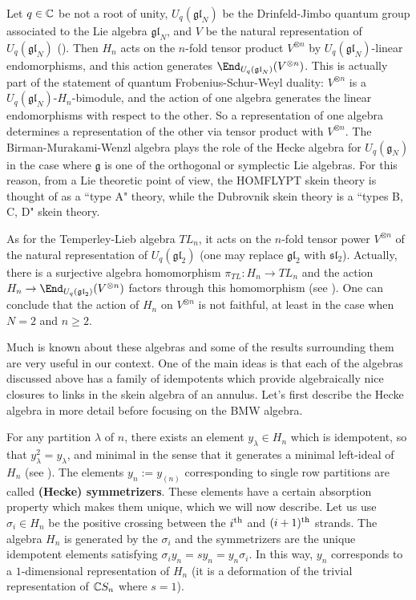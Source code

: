 Let $q \in \mathbb{C}$ be not a root of unity, $U_q(\mathfrak{gl}_N)$ be the Drinfeld-Jimbo quantum group associated to the Lie algebra $\mathfrak{gl}_N$, and $V$ be the natural representation of $U_q(\mathfrak{gl}_N)$ (). Then $H_n$ acts on the $n$-fold tensor product $V^{\otimes n}$ by $U_q(\mathfrak{gl}_N)$-linear endomorphisms, and this action generates $\End_{U_q(\mathfrak{gl}_N)}(V^{\otimes n})$. This is actually part of the statement of quantum Frobenius-Schur-Weyl duality: $V^{\otimes n}$ is a $U_q(\mathfrak{gl}_N)$-$H_n$-bimodule, and the action of one algebra generates the linear endomorphisms with respect to the other. So a representation of one algebra determines a representation of the other via tensor product with $V^{\otimes n}$. The Birman-Murakami-Wenzl algebra plays the role of the Hecke algebra for $U_q(\mathfrak{g}_N)$ in the case where $\mathfrak{g}$ is one of the orthogonal or symplectic Lie algebras. For this reason, from a Lie theoretic point of view, the HOMFLYPT skein theory is thought of as a ``type A" theory, while the Dubrovnik skein theory is a ``types B, C, D" skein theory.

As for the Temperley-Lieb algebra $TL_n$, it acts on the $n$-fold tensor power $V^{\otimes n}$ of the natural representation of $U_q(\mathfrak{gl}_2)$ (one may replace $\mathfrak{gl}_2$ with $\mathfrak{sl}_2$). Actually, there is a surjective algebra homomorphism $\pi_{TL}: H_n \to TL_n$ and the action $H_n \to \End_{U_q(\mathfrak{gl}_2)}(V^{\otimes n})$ factors through this homomorphism (see ). One can conclude that the action of $H_n$ on $V^{\otimes n}$ is not faithful, at least in the case when $N=2$ and $n \geq 2$.

Much is known about these algebras and some of the results surrounding them are very useful in our context. One of the main ideas is that each of the algebras discussed above has a family of idempotents which provide algebraically nice closures to links in the skein algebra of an annulus. Let's first describe the Hecke algebra in more detail before focusing on the BMW algebra. 

For any partition $\lambda$ of $n$, there exists an element $y_\lambda \in H_n$ which is idempotent, so that $y_\lambda^2 = y_\lambda$, and minimal in the sense that it generates a minimal left-ideal of $H_n$ (see ). The elements $y_n := y_{(n)}$ corresponding to single row partitions are called \textbf{(Hecke) symmetrizers}. These elements have a certain absorption property which makes them unique, which we will now describe. Let us use $\sigma_i \in H_n$ be the positive crossing between the $i^{\rm{th}}$ and $(i+1)^{\rm{th}}$ strands. The algebra $H_n$ is generated by the $\sigma_i$ and the symmetrizers are the unique idempotent elements satisfying $\sigma_i y_n = s y_n = y_n \sigma_i$. In this way, $y_n$ corresponds to a $1$-dimensional representation of $H_n$ (it is a deformation of the trivial representation of $\mathbb{C} S_n$ where $s=1$).

